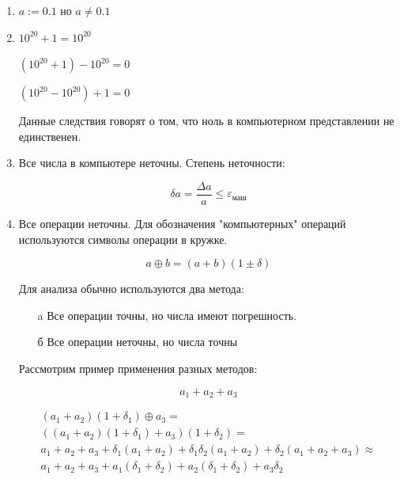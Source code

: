 \documentclass[10pt,a4paper]{article}
\begin{document}
		\begin{enumerate}
			\item $a := 0.1$ но $a \neq 0.1$
			
			\item $10^{20} + 1 = 10^{20}$
			
				$\left(10^{20} + 1\right) - 10^{20} = 0$
				
				$\left(10^{20} - 10^{20}\right) + 1 = 0$
				
				Данные следствия говорят о том, что ноль в компьютерном 
				представлении не единственен.
				
			\item Все числа в компьютере неточны. Степень неточности:
		
			\begin{equation}
				\delta a = \frac{\Delta a}{a} \leqslant 	
				\varepsilon_{\text{маш}}
			\end{equation}
			
			\item Все операции неточны. Для обозначения 
			"компьютерных" операций	используются символы операции 
			в кружке.
			
			\begin{equation}
				a \oplus b = \left(a + b\right)\left(1 \pm \delta
				\right)	
			\end{equation}
			
			Для анализа обычно используются два метода:
			
			\begin{itemize}
				\item[a] Все операции точны, но числа имеют 	
				погрешность.
				\item[б] Все операции неточны, но числа точны 
			\end{itemize}
			
			Рассмотрим пример применения разных методов:
			
			\begin{equation}
				a_{1} + a_{2} + a_{3}
			\end{equation}
			
			\begin{eqnarray}
				\left(a_{1} + a_{2}\right)\left(1 + \delta_{1}\right) \oplus a_{3} =\\ \left(\left(a_{1} + a_{2}\right)\left(1 + \delta_{1}\right) + a_{3}\right)\left(1 + \delta_{2}\right) =\\ a_{1} + a_{2} + a_{3} + \delta_{1}\left(a_{1} + a_{2}\right) + \delta_{1}\delta_{2}\left(a_{1} + a_{2}\right) + \delta_{2}\left(a_{1} + a_{2} + a_{3}\right) \approx \\a_{1} + a_{2} + a_{3} + a_{1}\left(\delta_{1} + \delta_{2}\right) + a_{2}\left(\delta_{1} + \delta_{2}\right) + a_{3}\delta_{2}
			\end{eqnarray}
		\end{enumerate}
		
\end{document}
